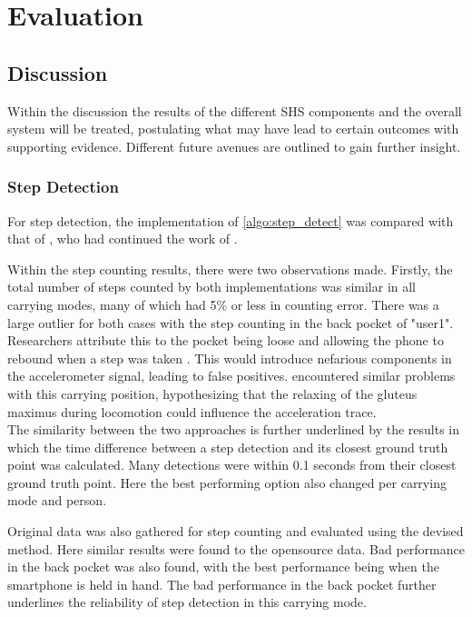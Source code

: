 \chapter{Evaluation}

\section{Discussion}
Within the discussion the results of the different \ac{SHS} components and the overall system will be treated, postulating what may have lead to certain outcomes with supporting evidence. Different future avenues are outlined to gain further insight.

\subsection*{Step Detection}
For step detection, the implementation of \cref{algo:step_detect} was compared with that of \citet{Salvi2018}, who had continued the work of \cite{Harle2013}.  \par 
Within the step counting results, there were two observations made. Firstly, the total number of steps counted by both implementations was similar in all carrying modes, many of which had 5\% or less in counting error. There was a large outlier for both cases with the step counting in the back pocket of "user1". Researchers attribute this to the pocket being loose and allowing the phone to rebound when a step was taken \cite{Salvi2018}. This would introduce nefarious components in the accelerometer signal, leading to false positives. \citet{Brajdic2013} encountered similar problems with this carrying position, hypothesizing that the relaxing of the gluteus maximus during locomotion could influence the acceleration trace.\\
The similarity between the two approaches is further underlined by the results in which the time difference between a step detection and its closest ground truth point was calculated. Many detections were within 0.1 seconds from their closest ground truth point. Here the best performing option also changed per carrying mode and person.\par 
Original data was also gathered for step counting and evaluated using the devised method. Here similar results were found to the opensource data. Bad performance in the back pocket was also found, with the best performance being when the smartphone is held in hand. The bad performance in the back pocket further underlines the reliability of step detection in this carrying mode. \par  

